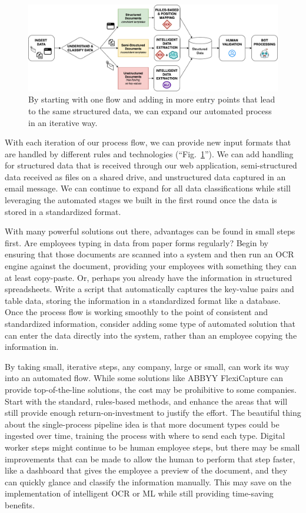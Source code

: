 \documentclass[conference]{IEEEtran}
\begin{document}
\begin{figure}[ht]
\centerline{\includegraphics[width=\columnwidth]{USE CASE - 4 - ALL.png}}
\caption{By starting with one flow and adding in more entry points that lead to the same structured data, we can expand our automated process in an iterative way.}
\label{figUseCase4}
\end{figure}

With each iteration of our process flow, we can provide new input formats that are handled by different rules and technologies (``Fig.~\ref{figUseCase4}''). We can add handling for structured data that is received through our web application, semi-structured data received as files on a shared drive, and unstructured data captured in an email message. We can continue to expand for all data classifications while still leveraging the automated stages we built in the first round once the data is stored in a standardized format.

With many powerful solutions out there, advantages can be found in small steps first. Are employees typing in data from paper forms regularly? Begin by ensuring that those documents are scanned into a system and then run an OCR engine against the document, providing your employees with something they can at least copy-paste. Or, perhaps you already have the information in structured spreadsheets. Write a script that automatically captures the key-value pairs and table data, storing the information in a standardized format like a database. Once the process flow is working smoothly to the point of consistent and standardized information, consider adding some type of automated solution that can enter the data directly into the system, rather than an employee copying the information in.

By taking small, iterative steps, any company, large or small, can work its way into an automated flow. While some solutions like ABBYY FlexiCapture can provide top-of-the-line solutions, the cost may be prohibitive to some companies. Start with the standard, rules-based methods, and enhance the areas that will still provide enough return-on-investment to justify the effort. The beautiful thing about the single-process pipeline idea is that more document types could be ingested over time, training the process with where to send each type. Digital worker steps might continue to be human employee steps, but there may be small improvements that can be made to allow the human to perform that step faster, like a dashboard that gives the employee a preview of the document, and they can quickly glance and classify the information manually. This may save on the implementation of intelligent OCR or ML while still providing time-saving benefits.
\end{document}
